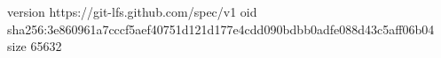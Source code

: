 version https://git-lfs.github.com/spec/v1
oid sha256:3e860961a7cccf5aef40751d121d177e4cdd090bdbb0adfe088d43c5aff06b04
size 65632
